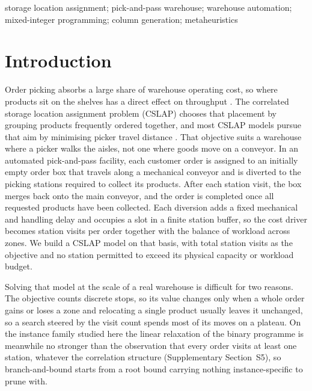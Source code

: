 \documentclass[]{interact}
\begin{document}
\begin{keywords}
storage location assignment; pick-and-pass warehouse; warehouse automation; mixed-integer programming; column generation; metaheuristics
\end{keywords}


\section{Introduction}
Order picking absorbs a large share of warehouse operating cost, so where products sit on the shelves has a direct effect on throughput \citep{xie2024combi}. The correlated storage location assignment problem (CSLAP) chooses that placement by grouping products frequently ordered together, and most CSLAP models pursue that aim by minimising picker travel distance \citep{islam2023}. That objective suits a warehouse where a picker walks the aisles, not one where goods move on a conveyor. In an automated pick-and-pass facility, each customer order is assigned to an initially empty order box that travels along a mechanical conveyor and is diverted to the picking stations required to collect its products. After each station visit, the box merges back onto the main conveyor, and the order is completed once all requested products have been collected. Each diversion adds a fixed mechanical and handling delay and occupies a slot in a finite station buffer, so the cost driver becomes station visits per order together with the balance of workload across zones. We build a CSLAP model on that basis, with total station visits as the objective and no station permitted to exceed its physical capacity or workload budget.

Solving that model at the scale of a real warehouse is difficult for two reasons. The objective counts discrete stops, so its value changes only when a whole order gains or loses a zone and relocating a single product usually leaves it unchanged, so a search steered by the visit count spends most of its moves on a plateau. On the instance family studied here the linear relaxation of the binary programme is meanwhile no stronger than the observation that every order visits at least one station, whatever the correlation structure (Supplementary Section~S5), so branch-and-bound starts from a root bound carrying nothing instance-specific to prune with.
\end{document}
